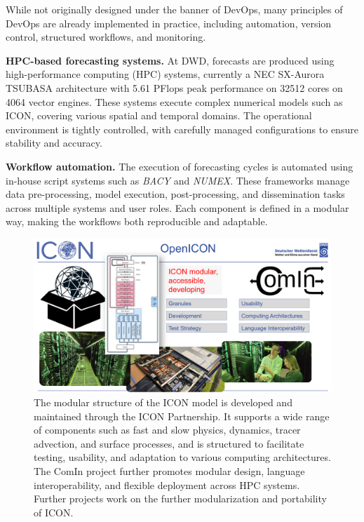 While not originally designed under the banner of DevOps, many principles of DevOps are already implemented in practice, including automation, version control, structured workflows, and monitoring.

{\bf HPC-based forecasting systems.} At DWD, forecasts are produced using high-performance computing (HPC) systems, currently a NEC SX-Aurora TSUBASA architecture with 5.61 PFlops peak performance on 32512 cores on 4064 vector engines. These systems execute complex numerical models such as ICON, covering various spatial and temporal domains. The operational environment is tightly controlled, with carefully managed configurations to ensure stability and accuracy.

{\bf Workflow automation.} The execution of forecasting cycles is automated using in-house script systems such as {\em BACY} and {\em NUMEX}. These frameworks manage data pre-processing, model execution, post-processing, and dissemination tasks across multiple systems and user roles. Each component is defined in a modular way, making the workflows both reproducible and adaptable.

\begin{figure}[ht]
	\centering
	\includegraphics[width=\textwidth]{images/ICON_modular.png}
	\caption{The modular structure of the ICON model is developed and maintained through the ICON Partnership. It supports a wide range of components such as fast and slow physics, dynamics, tracer advection, and surface processes, and is structured to facilitate testing, usability, and adaptation to various computing architectures. The ComIn project further promotes modular design, language interoperability, and flexible deployment across HPC systems. Further projects work on the further modularization and portability of ICON.}
	\label{fig:icon_modular_openicon}
\end{figure}


